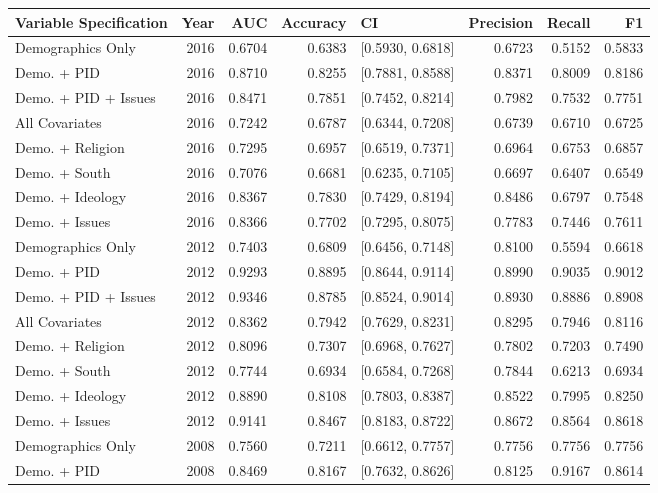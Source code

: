 \begin{longtable}{lrrrlrrr}
  \toprule
Variable Specification & Year & AUC & Accuracy & CI & Precision & Recall & F1 \\ 
  \midrule
Demographics Only & 2016 & 0.6704 & 0.6383 & [0.5930, 0.6818] & 0.6723 & 0.5152 & 0.5833 \\ 
  Demo. + PID & 2016 & 0.8710 & 0.8255 & [0.7881, 0.8588] & 0.8371 & 0.8009 & 0.8186 \\ 
  Demo. + PID + Issues & 2016 & 0.8471 & 0.7851 & [0.7452, 0.8214] & 0.7982 & 0.7532 & 0.7751 \\ 
  All Covariates & 2016 & 0.7242 & 0.6787 & [0.6344, 0.7208] & 0.6739 & 0.6710 & 0.6725 \\ 
  Demo. + Religion & 2016 & 0.7295 & 0.6957 & [0.6519, 0.7371] & 0.6964 & 0.6753 & 0.6857 \\ 
  Demo. + South & 2016 & 0.7076 & 0.6681 & [0.6235, 0.7105] & 0.6697 & 0.6407 & 0.6549 \\ 
  Demo. + Ideology & 2016 & 0.8367 & 0.7830 & [0.7429, 0.8194] & 0.8486 & 0.6797 & 0.7548 \\ 
  Demo. + Issues & 2016 & 0.8366 & 0.7702 & [0.7295, 0.8075] & 0.7783 & 0.7446 & 0.7611 \\ 
  Demographics Only & 2012 & 0.7403 & 0.6809 & [0.6456, 0.7148] & 0.8100 & 0.5594 & 0.6618 \\ 
  Demo. + PID & 2012 & 0.9293 & 0.8895 & [0.8644, 0.9114] & 0.8990 & 0.9035 & 0.9012 \\ 
  Demo. + PID + Issues & 2012 & 0.9346 & 0.8785 & [0.8524, 0.9014] & 0.8930 & 0.8886 & 0.8908 \\ 
  All Covariates & 2012 & 0.8362 & 0.7942 & [0.7629, 0.8231] & 0.8295 & 0.7946 & 0.8116 \\ 
  Demo. + Religion & 2012 & 0.8096 & 0.7307 & [0.6968, 0.7627] & 0.7802 & 0.7203 & 0.7490 \\ 
  Demo. + South & 2012 & 0.7744 & 0.6934 & [0.6584, 0.7268] & 0.7844 & 0.6213 & 0.6934 \\ 
  Demo. + Ideology & 2012 & 0.8890 & 0.8108 & [0.7803, 0.8387] & 0.8522 & 0.7995 & 0.8250 \\ 
  Demo. + Issues & 2012 & 0.9141 & 0.8467 & [0.8183, 0.8722] & 0.8672 & 0.8564 & 0.8618 \\ 
  Demographics Only & 2008 & 0.7560 & 0.7211 & [0.6612, 0.7757] & 0.7756 & 0.7756 & 0.7756 \\ 
  Demo. + PID & 2008 & 0.8469 & 0.8167 & [0.7632, 0.8626] & 0.8125 & 0.9167 & 0.8614 \\ 

\end{longtable}
